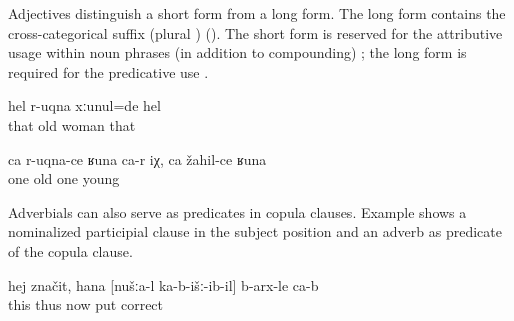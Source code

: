 Adjectives distinguish a short form from a long form. The long form contains the cross-categorical suffix  (plural ) (). The short form is reserved for the attributive usage within noun phrases (in addition to compounding) ; the long form is required for the predicative use . 
%
\begin{exe}
	\ex	\label{ex:‎‎‎She was an old woman}
	\gll	hel	r-uqna	xːunul=de	hel\\
		that	old	woman	that\\
	\glt	{}

	\ex	\label{ex:One is like old, one like young}
	\gll	ca	r-uqna-ce	ʁuna	ca-r	iχ,	ca	žahil-ce	ʁuna\\
		one	old				one	young		\\
	\glt	{}
\end{exe}

Adverbials can also serve as predicates in copula clauses. Example  shows a nominalized participial clause in the subject position and an adverb as predicate of the copula clause.
%
\begin{exe}
	\ex	\label{ex:‎This means, how we put (the pictures) down is correct}
	\gll	hej	značit,	hana	[nušːa-l	ka-b-išː-ib-il]	b-arx-le	ca-b\\
		this	thus	now		put	correct	\\
	\glt	{}
\end{exe}

